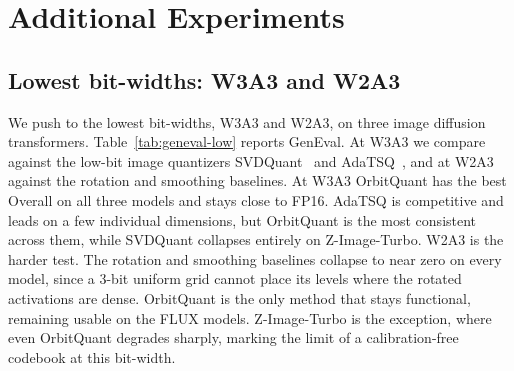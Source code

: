 \section{Additional Experiments}
\label{supple:add-exp}
\subsection{Lowest bit-widths: W3A3 and W2A3}
\label{supple:low_bit}
We push to the lowest bit-widths, W3A3 and W2A3, on three image diffusion transformers. Table~\ref{tab:geneval-low} reports GenEval. At W3A3 we compare against the low-bit image quantizers SVDQuant~\cite{li2024svdquant} and AdaTSQ~\cite{zhang2026adatsq}, and at W2A3 against the rotation and smoothing baselines.
At W3A3 OrbitQuant has the best Overall on all three models and stays close to FP16. AdaTSQ is competitive and leads on a few individual dimensions, but OrbitQuant is the most consistent across them, while SVDQuant collapses entirely on Z-Image-Turbo.
W2A3 is the harder test. The rotation and smoothing baselines collapse to near zero on every model, since a 3-bit uniform grid cannot place its levels where the rotated activations are dense. OrbitQuant is the only method that stays functional, remaining usable on the FLUX models. Z-Image-Turbo is the exception, where even OrbitQuant degrades sharply, marking the limit of a calibration-free codebook at this bit-width.


